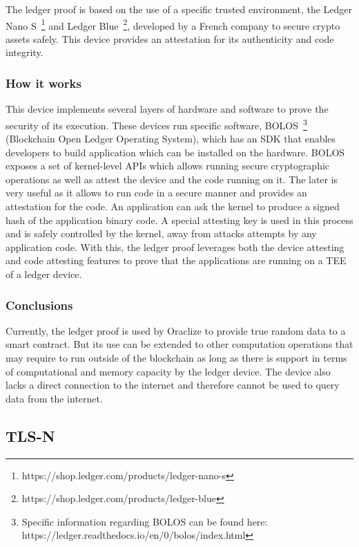 The ledger proof is based on the use of a specific trusted environment, the Ledger Nano S~\footnote{https://shop.ledger.com/products/ledger-nano-s} and Ledger Blue~\footnote{https://shop.ledger.com/products/ledger-blue}, developed by a French company to secure crypto assets safely. This device provides an attestation for its authenticity and code integrity.

\subsubsection{How it works}

This device implements several layers of hardware and software to prove the security of its execution. These devices run specific software, BOLOS~\footnote{Specific information regarding BOLOS can be found here: https://ledger.readthedocs.io/en/0/bolos/index.html} (Blockchain Open Ledger Operating System), which has an SDK that enables developers to build application which can be installed on the hardware. BOLOS exposes a set of kernel-level APIs which allows running secure cryptographic operations as well as attest the device and the code running on it. The later is very useful as it allows to run code in a secure manner and provides an attestation for the code. An application can ask the kernel to produce a signed hash of the application binary code. A special attesting key is used in this process and is safely controlled by the kernel, away from attacks attempts by any application code. With this, the ledger proof leverages both the device attesting and code attesting features to prove that the applications are running on a TEE of a ledger device.

\subsubsection{Conclusions}

Currently, the ledger proof is used by Oraclize to provide true random data to a smart contract. But its use can be extended to other computation operations that may require to run outside of the blockchain as long as there is support in terms of computational and memory capacity by the ledger device. The device also lacks a direct connection to the internet and therefore cannot be used to query data from the internet.


\subsection{TLS-N}

